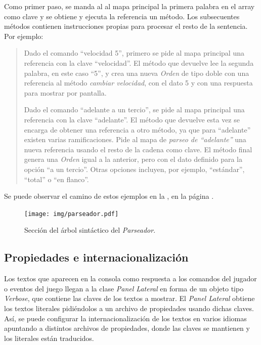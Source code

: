 \documentclass[a4paper,
	11pt,
	parskip=full,
	bibliography=totoc,
	twoside
	]{scrartcl}
\begin{document}
			Como primer paso, se manda al al mapa principal la primera palabra en el array como clave y se obtiene y ejecuta la referencia un método. Los subsecuentes métodos contienen instrucciones propias para procesar el resto de la sentencia. Por ejemplo:
			\begin{quote}
				Dado el comando ``velocidad 5'', primero se pide al mapa principal una referencia con la clave ``velocidad''. El método que devuelve lee la segunda palabra, en este caso ``5'', y crea una nueva \textit{Orden} de tipo doble con una referencia al método \textit{cambiar velocidad}, con el dato 5 y con una respuesta para mostrar por pantalla.
				
				Dado el comando ``adelante a un tercio'', se pide al mapa principal una referencia con la clave ``adelante''. El método que devuelve esta vez se encarga de obtener una referencia a otro método, ya que para ``adelante'' existen varias ramificaciones. Pide al mapa de \textit{parseo de ``adelante''} una nueva referencia usando el resto de la cadena como clave. El método final genera una \textit{Orden} igual a la anterior, pero con el dato definido para la opción ``a un tercio''. Otras opciones incluyen, por ejemplo, ``estándar'', ``total'' o ``en flanco''.
			\end{quote}
		
			Se puede observar el camino de estos ejemplos en la , en la página \pageref{fig:parseador}.
			
		\begin{figure}[p]
			\centering
			\texttt{[image: img/parseador.pdf]}
			\caption{Sección del árbol sintáctico del \textit{Parseador}.}
			\label{fig:parseador}
		\end{figure}
	
	\subsection{Propiedades e internacionalización}
	\label{subsec:propiedades_internacionalizacion}
		Los textos que aparecen en la consola \cite{so_custom_font} como respuesta a los comandos del jugador o eventos del juego llegan a la clase \textit{Panel Lateral} en forma de un objeto tipo \textit{Verbose}, que contiene las claves de los textos a mostrar. El \textit{Panel Lateral} obtiene los textos literales pidiéndolos a un archivo de propiedades usando dichas claves. Así, se puede configurar la internacionalización de los textos en varios idiomas apuntando a distintos archivos de propiedades, donde las claves se mantienen y los literales están traducidos.
		
\end{document}
